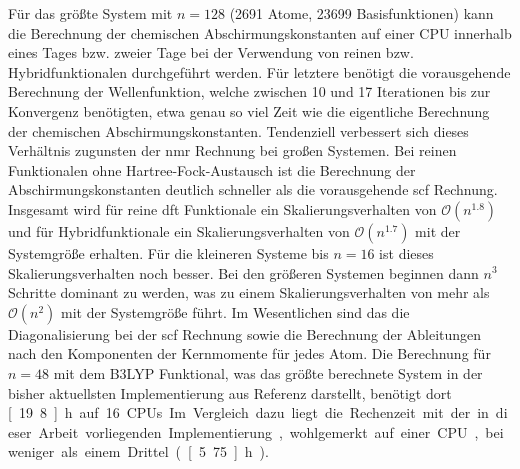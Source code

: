 \FloatBarrier

Für das größte System mit $n=128$ (2691 Atome, 23699 Basisfunktionen) kann die Berechnung der chemischen Abschirmungskonstanten auf einer CPU innerhalb eines Tages bzw. zweier Tage bei der Verwendung von reinen bzw. Hybridfunktionalen durchgeführt werden. Für letztere benötigt die vorausgehende Berechnung der Wellenfunktion, welche zwischen 10 und 17 Iterationen bis zur Konvergenz benötigten, etwa genau so viel Zeit wie die eigentliche Berechnung der chemischen Abschirmungskonstanten. Tendenziell verbessert sich dieses Verhältnis zugunsten der \ac{nmr} Rechnung bei großen Systemen. Bei reinen Funktionalen ohne Hartree-Fock-Austausch ist die Berechnung der Abschirmungskonstanten deutlich schneller als die vorausgehende \ac{scf} Rechnung. Insgesamt wird für reine \ac{dft} Funktionale ein Skalierungsverhalten von $\mathcal{O}(n^{1.8})$ und für Hybridfunktionale ein Skalierungsverhalten von $\mathcal{O}(n^{1.7})$ mit der Systemgröße erhalten. Für die kleineren Systeme bis $n=16$ ist dieses Skalierungsverhalten noch besser. Bei den größeren Systemen beginnen dann $n^3$ Schritte dominant zu werden, was zu einem Skalierungsverhalten von mehr als $\mathcal{O}(n^{2})$ mit der Systemgröße führt. Im Wesentlichen sind das die Diagonalisierung bei der \ac{scf} Rechnung sowie die Berechnung der Ableitungen nach den Komponenten der Kernmomente für jedes Atom. Die Berechnung für $n=48$ mit dem B3LYP Funktional, was das größte berechnete System in der bisher aktuellsten Implementierung aus Referenz \cite{kumar2016nuclei} darstellt, benötigt dort \unit[19.8]{h} auf 16 CPUs. Im Vergleich dazu liegt die Rechenzeit mit der in dieser Arbeit vorliegenden Implementierung, wohlgemerkt auf einer CPU, bei weniger als einem Drittel (\unit[5.75]{h}). 


